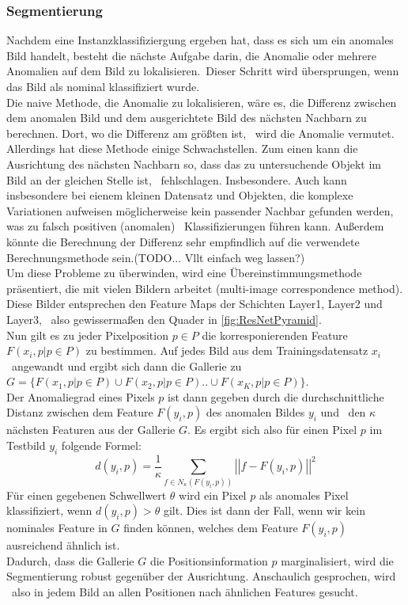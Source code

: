 \subsubsection*{Segmentierung}
Nachdem eine Instanzklassifiziergung ergeben hat, dass es sich um ein anomales Bild handelt, besteht die nächste Aufgabe darin, die Anomalie oder mehrere Anomalien auf dem Bild zu lokalisieren.\
Dieser Schritt wird übersprungen, wenn das Bild als nominal klassifiziert wurde.\\
Die naive Methode, die Anomalie zu lokalisieren, wäre es, die Differenz zwischen dem anomalen Bild und dem ausgerichtete Bild des nächsten Nachbarn zu berechnen. Dort, wo die Differenz am größten ist, \
wird die Anomalie vermutet. Allerdings hat diese Methode einige Schwachstellen. Zum einen kann die Ausrichtung des nächsten Nachbarn so, dass das zu untersuchende Objekt im Bild an der gleichen Stelle ist, \
fehlschlagen. Insbesondere. Auch kann insbesondere bei eienem kleinen Datensatz und Objekten, die komplexe Variationen aufweisen möglicherweise kein passender Nachbar gefunden werden, was zu falsch positiven (anomalen) \
Klassifizierungen führen kann. Außerdem könnte die Berechnung der Differenz sehr empfindlich auf die verwendete Berechnungsmethode sein.(TODO... Vllt einfach weg lassen?)\\ 
Um diese Probleme zu überwinden, wird eine Übereinstimmungsmethode präsentiert, die mit vielen \glqq Bildern\grqq{} arbeitet (\glqq multi-image correspondence method\grqq{}). Diese Bilder entsprechen den Feature Maps der Schichten Layer1, Layer2 und Layer3, \
also gewissermaßen den Quader in \ref{fig:ResNetPyramid}.\\
Nun gilt es zu jeder Pixelposition $p\in P$ die korresponierenden Feature $F(x_{i}, p | p\in P)$ zu bestimmen. Auf jedes Bild aus dem Trainingsdatensatz $x_{i}$ \ 
angewandt und ergibt sich dann die \glqq Gallerie\grqq{} zu $G = \{ {F(x_{1}, p | p\in P)}\cup {F(x_{2},p|p\in P)} .. \cup {F(x_{K},p|p\in P)} \}$.\\
Der Anomaliegrad eines Pixels $p$ ist dann gegeben durch die durchschnittliche Distanz zwischen dem Feature $F(y_{i},p)$ des anomalen Bildes $y_{i}$ und \ 
den $\kappa$ nächsten Featuren aus der Gallerie $G$. Es ergibt sich also für einen Pixel $p$ im Testbild $y_{i}$ folgende Formel: \
$$
d(y_{i},p) = \frac{1}{\kappa} \sum_{f\in N_{\kappa}(F(y_{i},p))} \left|\left| f - F(y_{i},p) \right|\right|^{2}
$$
Für einen gegebenen Schwellwert $\theta$ wird ein Pixel $p$ als anomales Pixel klassifiziert, wenn $d(y_{i},p) > \theta$ gilt.
Dies ist dann der Fall, wenn wir kein nominales Feature in $G$ finden können, welches dem Feature $F(y_{i},p)$ ausreichend ähnlich ist.\\
Dadurch, dass die Gallerie $G$ die Positionsinformation $p$ marginalisiert, wird die Segmentierung robust gegenüber der Ausrichtung. Anschaulich gesprochen, wird \
also in jedem Bild an allen Positionen nach ähnlichen Features gesucht.
